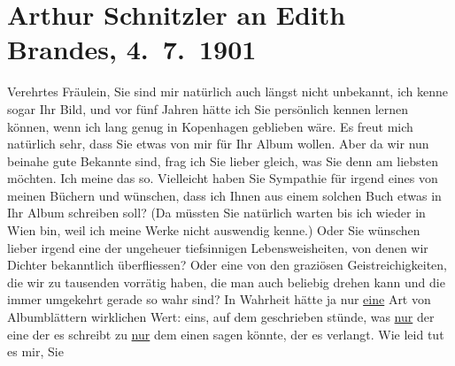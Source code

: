 

         
         \renewcommand{\erwaehntePersonen}{Personen: Georg Brandes, Edith Philipp}
         \renewcommand{\erwaehnteOrte}{Orte: Kopenhagen, St. Anton am Arlberg, Wien}
         \renewcommand{\erwaehnteWerke}{}
               \section[Arthur Schnitzler an Edith Brandes, 4. 7. 1901]{ Arthur Schnitzler an Edith Brandes, 4. 7. 1901}\nopagebreak{}\rehead{ }\begin{ledgroupsized}[t]{13cm}\normalsize\beginnumbering \toendnotes[C]{\smallbreak\pagebreak[2]} 
\toendnotes[C]{\smallbreak}\pstart{}{\pb}Verehrtes Fräulein,\pend\pstart
           Sie sind mir natürlich auch längst nicht unbekannt, ich kenne sogar Ihr Bild, und vor
               fünf Jahren hätte ich Sie persönlich kennen lernen können, wenn ich lang genug in Kopenhagen geblieben wäre. Es freut mich
               natürlich sehr, dass Sie etwas von mir für Ihr Album wollen. Aber da wir nun beinahe
               gute Bekannte sind, frag ich Sie lieber gleich, was Sie denn am liebsten möchten. Ich
               meine das so. Vielleicht haben Sie Sympathie für irgend eines von meinen Büchern und
               wünschen, dass ich Ihnen aus einem solchen Buch etwas in Ihr Album schreiben soll?
               (Da müssten Sie natürlich warten bis ich wieder in Wien bin, weil ich meine Werke nicht auswendig kenne.) Oder Sie wünschen
               lieber irgend eine der ungeheuer tiefsinnigen Lebensweisheiten, von denen wir Dichter
               bekanntlich überfliessen? Oder eine von den graziösen Geistreichigkeiten, die wir zu
               tausenden vorrätig haben, die man auch beliebig drehen kann und die immer umgekehrt
               gerade so wahr sind? In Wahrheit hätte ja nur \uline{eine}
               Art von Albumblättern wirklichen Wert: eins, auf dem geschrieben stünde, was \uline{nur} der eine der es schreibt zu \uline{nur} dem einen sagen könnte, der es verlangt. Wie leid tut es mir, Sie

\end{ledgroupsized}

